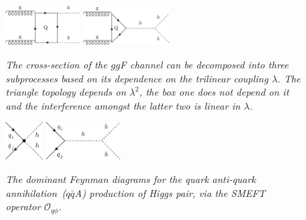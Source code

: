 \begin{figure}[t]
	\centering
	\includegraphics[width=0.25\textwidth]{fig/ggfbox} 	\hspace*{0.5 cm}
	\includegraphics[width=0.29\textwidth]{fig/ggftri}
	\caption{\it The cross-section of the $gg$F channel can be decomposed into three subprocesses based on its dependence on the trilinear coupling $\lambda$. The triangle topology depends on $\lambda^2$, the box one does not depend on it and the interference amongst the latter two is linear in $\lambda$. }
	\label{fig:ggfsub}
\end{figure}  
\begin{figure}[t]
	\centering
	\includegraphics[width=0.125\textwidth]{fig/qqh_dim6}
	\hspace*{0.5 cm}
	\includegraphics[width=0.25\textwidth]{fig/qqh_higgs_prpg}
	\caption{\it The dominant Feynman diagrams for the quark anti-quark annihilation~($q\bar q$A)  production of Higgs pair, via the SMEFT operator $ \mathcal O_{q\phi}$. }
	\label{fig:qqa}
\end{figure}

